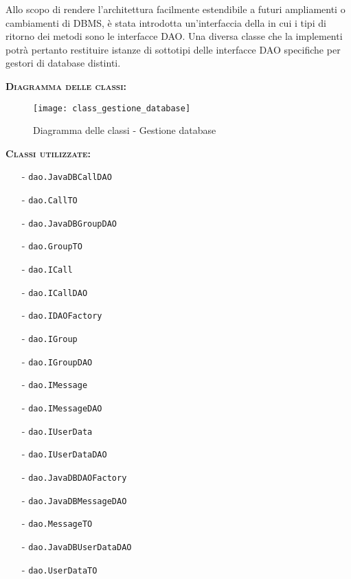 \begin{description}
Allo scopo di rendere l'architettura facilmente estendibile a futuri ampliamenti o cambiamenti di DBMS, è stata introdotta un'interfaccia della  in cui i tipi di ritorno dei metodi sono le interfacce DAO\@. Una diversa classe  che la implementi potrà pertanto restituire istanze di sottotipi delle interfacce DAO specifiche per gestori di database distinti.

\item{\scshape\bfseries Diagramma delle classi:}
\begin{figure}[H]
  \centering
  \texttt{[image: class\_gestione\_database]}
  \caption{Diagramma delle classi - Gestione database}\label{fig:gestione_database}
\end{figure}


	\item{\scshape\bfseries Classi utilizzate:}
	\begin{itemize}[nolistsep, noitemsep]
	  \item[-] \texttt{dao.JavaDBCallDAO}
	  \item[-] \texttt{dao.CallTO}
	  \item[-] \texttt{dao.JavaDBGroupDAO}
	  \item[-] \texttt{dao.GroupTO}
	  \item[-] \texttt{dao.ICall}
	  \item[-] \texttt{dao.ICallDAO}
	  \item[-] \texttt{dao.IDAOFactory}
	  \item[-] \texttt{dao.IGroup}
	  \item[-] \texttt{dao.IGroupDAO}
	  \item[-] \texttt{dao.IMessage}
	  \item[-] \texttt{dao.IMessageDAO}
	  \item[-] \texttt{dao.IUserData}
	  \item[-] \texttt{dao.IUserDataDAO}
	  \item[-] \texttt{dao.JavaDBDAOFactory}
	  \item[-] \texttt{dao.JavaDBMessageDAO}
	  \item[-] \texttt{dao.MessageTO}
	  \item[-] \texttt{dao.JavaDBUserDataDAO}
	  \item[-] \texttt{dao.UserDataTO}
	\end{itemize}
\end{description}

